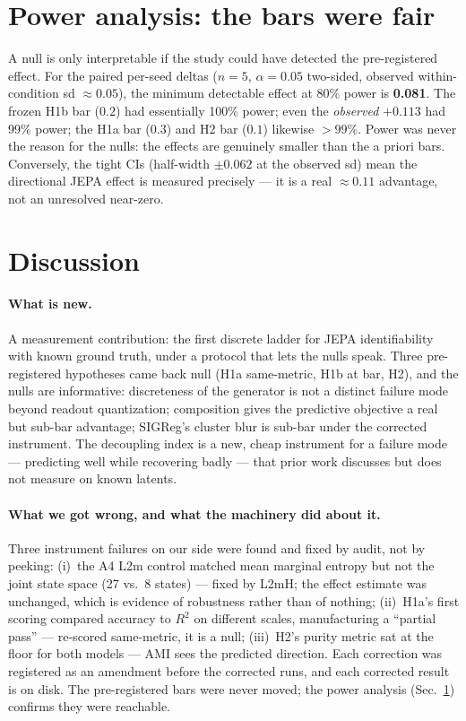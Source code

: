 \documentclass[11pt]{article}
\begin{document}
\section{Power analysis: the bars were fair}
\label{sec:power}
A null is only interpretable if the study could have detected the pre-registered
effect. For the paired per-seed deltas ($n{=}5$, $\alpha{=}0.05$ two-sided,
observed within-condition sd ${\approx}0.05$), the minimum detectable effect at
80\% power is \textbf{0.081}. The frozen H1b bar ($0.2$) had essentially 100\%
power; even the \emph{observed} $+0.113$ had 99\% power; the H1a bar ($0.3$)
and H2 bar ($0.1$) likewise $>99$\%. Power was never the reason for the nulls:
the effects are genuinely smaller than the a priori bars. Conversely, the tight
CIs (half-width ${\pm}0.062$ at the observed sd) mean the directional JEPA
effect is measured precisely --- it is a real $\approx0.11$ advantage, not an
unresolved near-zero.

\section{Discussion}
\label{sec:discussion}
\paragraph{What is new.}
A measurement contribution: the first discrete ladder for JEPA identifiability
with known ground truth, under a protocol that lets the nulls speak. Three
pre-registered hypotheses came back null (H1a same-metric, H1b at bar, H2),
and the nulls are informative: discreteness of the generator is not a distinct
failure mode beyond readout quantization; composition gives the predictive
objective a real but sub-bar advantage; SIGReg's cluster blur is sub-bar under
the corrected instrument. The decoupling index is a new, cheap instrument for
a failure mode --- predicting well while recovering badly --- that prior work
discusses but does not measure on known latents.

\paragraph{What we got wrong, and what the machinery did about it.}
Three instrument failures on our side were found and fixed by audit, not by
peeking: (i)~the A4 L2m control matched mean marginal entropy but not the joint
state space (27 vs.\ 8 states) --- fixed by L2mH; the effect estimate was
unchanged, which is evidence of robustness rather than of nothing;
(ii)~H1a's first scoring compared accuracy to $R^2$ on different scales,
manufacturing a ``partial pass'' --- re-scored same-metric, it is a null;
(iii)~H2's purity metric sat at the floor for both models --- AMI sees the
predicted direction. Each correction was registered as an amendment before the
corrected runs, and each corrected result is on disk. The pre-registered bars
were never moved; the power analysis (Sec.~\ref{sec:power}) confirms they were
reachable.
\end{document}
